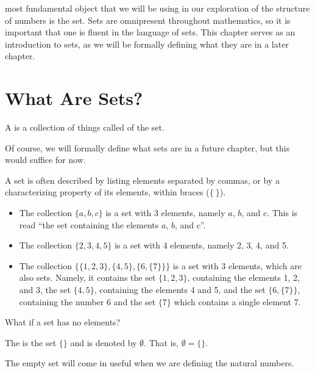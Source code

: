  most fundamental object that we will be using in our exploration of the structure of numbers is the set. Sets are omnipresent throughout mathematics, so it is important that one is fluent in the language of sets. This chapter serves as an introduction to sets, as we will be formally defining what they are in a later chapter.

\section{What Are Sets?}
\begin{definition}
    A  is a collection of things called  of the set.
\end{definition}

Of course, we will formally define what sets are in a future chapter, but this would suffice for now.

A set is often described by listing elements separated by commas, or by a characterizing property of its elements, within braces ($\{ \ \}$).

\begin{example}
    \begin{itemize}[leftmargin=*]
        \item The collection $\{a, b, c\}$ is a set with 3 elements, namely $a$, $b$, and $c$. This is read ``the set containing the elements $a$, $b$, and $c$''.
        \item The collection $\{2, 3, 4, 5\}$ is a set with 4 elements, namely 2, 3, 4, and 5.
        \item The collection $\{\{1, 2, 3\}, \{4, 5\}, \{6, \{7\}\}\}$ is a set with 3 elements, which are also sets. Namely, it contains the set $\{1, 2, 3\}$, containing the elements 1, 2, and 3, the set $\{4, 5\}$, containing the elements 4 and 5, and the set $\{6, \{7\}\}$, containing the number 6 and the set $\{7\}$ which contains a single element 7.
    \end{itemize}
\end{example}

What if a set has no elements?
\begin{definition}
    The  is the set $\{\}$ and is denoted by $\emptyset$. That is, $\emptyset = \{\}$.
\end{definition}

The empty set will come in useful when we are defining the natural numbers.

